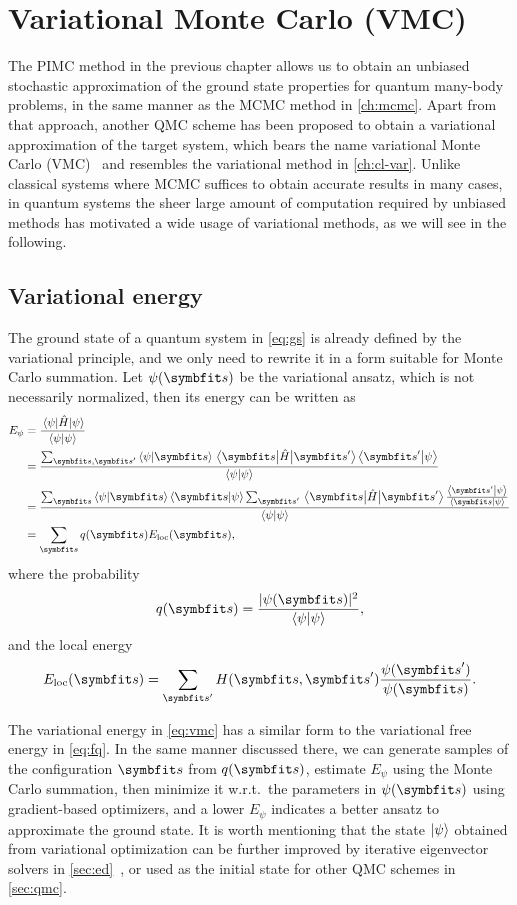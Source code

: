 \chapter{Variational Monte Carlo (VMC)}
\label{ch:vmc}

The PIMC method in the previous chapter allows us to obtain an unbiased stochastic approximation of the ground state properties for quantum many-body problems, in the same manner as the MCMC method in \cref{ch:mcmc}. Apart from that approach, another QMC scheme has been proposed to obtain a variational approximation of the target system, which bears the name variational Monte Carlo (VMC)~\cite{scherer2017computational, sorella2005wave} and resembles the variational method in \cref{ch:cl-var}. Unlike classical systems where MCMC suffices to obtain accurate results in many cases, in quantum systems the sheer large amount of computation required by unbiased methods has motivated a wide usage of variational methods, as we will see in the following.

\section{Variational energy}

The ground state of a quantum system in \cref{eq:gs} is already defined by the variational principle, and we only need to rewrite it in a form suitable for Monte Carlo summation. Let $\psi(\vs)$ be the variational ansatz, which is not necessarily normalized, then its energy can be written as
\begin{align}
E_\psi &= \frac{\ev{\hat{H}}{\psi}}{\ip{\psi}} \\
&= \frac
{\sum_{\vs, \vs'} \ip{\psi}{\vs} \mel{\vs}{\hat{H}}{\vs'} \ip{\vs'}{\psi}}
{\ip{\psi}} \\
&= \frac
{\sum_\vs \ip{\psi}{\vs} \ip{\vs}{\psi} \sum_{\vs'} \mel{\vs}{\hat{H}}{\vs'} \frac{\ip{\vs'}{\psi}}{\ip{\vs}{\psi}}}
{\ip{\psi}} \\
&= \sum_\vs q(\vs) E_\text{loc}(\vs), \label{eq:vmc}
\end{align}
where the probability
\begin{equation}
q(\vs) = \frac{|\psi(\vs)|^2}{\ip{\psi}},
\end{equation}
and the local energy
\begin{equation}
E_\text{loc}(\vs) = \sum_{\vs'} H(\vs, \vs') \frac{\psi(\vs')}{\psi(\vs)}.
\end{equation}

The variational energy in \cref{eq:vmc} has a similar form to the variational free energy in \cref{eq:fq}. In the same manner discussed there, we can generate samples of the configuration $\vs$ from $q(\vs)$, estimate $E_\psi$ using the Monte Carlo summation, then minimize it w.r.t.\ the parameters in $\psi(\vs)$ using gradient-based optimizers, and a lower $E_\psi$ indicates a better ansatz to approximate the ground state. It is worth mentioning that the state $\ket{\psi}$ obtained from variational optimization can be further improved by iterative eigenvector solvers in \cref{sec:ed}~\cite{hu2013direct, chen2022systematic}, or used as the initial state for other QMC schemes in \cref{sec:qmc}.

